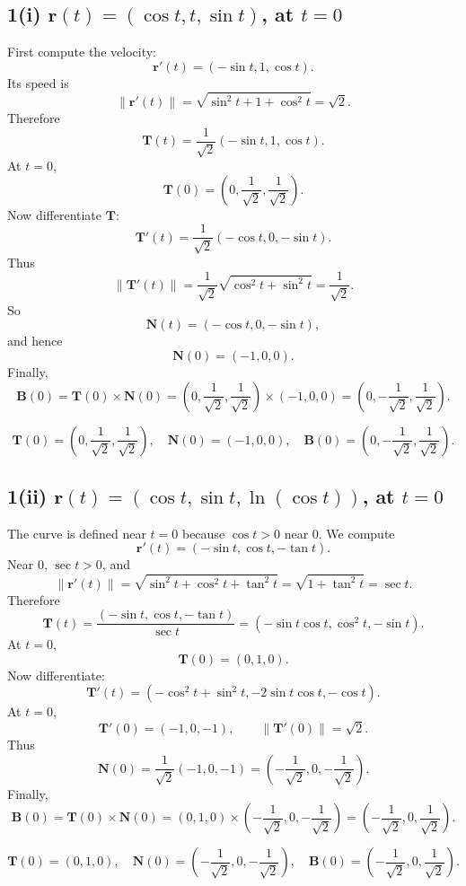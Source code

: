 \documentclass[11pt]{article}
\newcommand{\norm}[1]{\left\lVert #1 \right\rVert}
\begin{document}
\subsection{1(i) \(\mathbf r(t)=(\cos t,t,\sin t)\), at \(t=0\)}

First compute the velocity:
\[
\mathbf r'(t)=(-\sin t,1,\cos t).
\]
Its speed is
\[
\norm{\mathbf r'(t)}=\sqrt{\sin^2t+1+\cos^2t}=\sqrt{2}.
\]
Therefore
\[
\mathbf T(t)=\frac{1}{\sqrt2}(-\sin t,1,\cos t).
\]
At \(t=0\),
\[
\mathbf T(0)=\left(0,\frac{1}{\sqrt2},\frac{1}{\sqrt2}\right).
\]
Now differentiate \(\mathbf T\):
\[
\mathbf T'(t)=\frac{1}{\sqrt2}(-\cos t,0,-\sin t).
\]
Thus
\[
\norm{\mathbf T'(t)}=\frac{1}{\sqrt2}\sqrt{\cos^2t+\sin^2t}=\frac{1}{\sqrt2}.
\]
So
\[
\mathbf N(t)=(-\cos t,0,-\sin t),
\]
and hence
\[
\mathbf N(0)=(-1,0,0).
\]
Finally,
\[
\mathbf B(0)=\mathbf T(0)\times \mathbf N(0)
=\left(0,\frac{1}{\sqrt2},\frac{1}{\sqrt2}\right)\times(-1,0,0)
=\left(0,-\frac{1}{\sqrt2},\frac{1}{\sqrt2}\right).
\]

\begin{answerbox}
\[
\boxed{\mathbf T(0)=\left(0,\frac1{\sqrt2},\frac1{\sqrt2}\right),\quad
\mathbf N(0)=(-1,0,0),\quad
\mathbf B(0)=\left(0,-\frac1{\sqrt2},\frac1{\sqrt2}\right).}
\]
\end{answerbox}

\subsection{1(ii) \(\mathbf r(t)=(\cos t,\sin t,\ln(\cos t))\), at \(t=0\)}

The curve is defined near \(t=0\) because \(\cos t>0\) near \(0\). We compute
\[
\mathbf r'(t)=(-\sin t,\cos t,-\tan t).
\]
Near \(0\), \(\sec t>0\), and
\[
\norm{\mathbf r'(t)}
=\sqrt{\sin^2t+\cos^2t+\tan^2t}
=\sqrt{1+\tan^2t}
=\sec t.
\]
Therefore
\[
\mathbf T(t)=\frac{(-\sin t,\cos t,-\tan t)}{\sec t}
=(-\sin t\cos t,\cos^2t,-\sin t).
\]
At \(t=0\),
\[
\mathbf T(0)=(0,1,0).
\]
Now differentiate:
\[
\mathbf T'(t)=(-\cos^2t+\sin^2t,-2\sin t\cos t,-\cos t).
\]
At \(t=0\),
\[
\mathbf T'(0)=(-1,0,-1),
\qquad
\norm{\mathbf T'(0)}=\sqrt2.
\]
Thus
\[
\mathbf N(0)=\frac{1}{\sqrt2}(-1,0,-1)
=\left(-\frac1{\sqrt2},0,-\frac1{\sqrt2}\right).
\]
Finally,
\[
\mathbf B(0)=\mathbf T(0)\times\mathbf N(0)
=(0,1,0)\times\left(-\frac1{\sqrt2},0,-\frac1{\sqrt2}\right)
=\left(-\frac1{\sqrt2},0,\frac1{\sqrt2}\right).
\]

\begin{answerbox}
\[
\boxed{\mathbf T(0)=(0,1,0),\quad
\mathbf N(0)=\left(-\frac1{\sqrt2},0,-\frac1{\sqrt2}\right),\quad
\mathbf B(0)=\left(-\frac1{\sqrt2},0,\frac1{\sqrt2}\right).}
\]
\end{answerbox}
\end{document}

